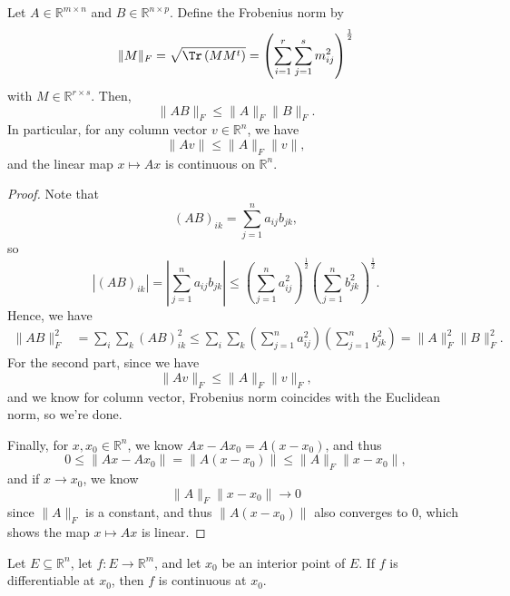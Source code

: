 \begin{theorem}
    Let \(A \in \mathbb{R} ^{m \times n}\) and \(B \in \mathbb{R} ^{n \times p}\). Define the Frobenius norm by 
    \[
        \lVert M \rVert_F = \sqrt{\Tr \left( MM^t \right) } = \left( \sum_{i=1}^r \sum_{j=1}^s m_{ij}^2   \right)^{\frac{1}{2}}   
    \]  
    with \(M \in \mathbb{R} ^{r \times s}\). Then, 
    \[
        \lVert AB \rVert_F \le \lVert A \rVert_F \lVert B \rVert_F.   
    \] 
    In particular, for any column vector \(v \in \mathbb{R} ^n\), we have 
    \[
        \lVert Av \rVert \le \lVert A \rVert_F \lVert v \rVert,   
    \] 
    and the linear map \(x \mapsto Ax\) is continuous on \(\mathbb{R} ^n\). 
\end{theorem}
\begin{proof}
    Note that 
    \[
        (AB)_{ik} = \sum_{j=1}^n a_{ij} b_{jk}, 
    \]
    so 
    \[
        \left\vert (AB)_{ik} \right\vert = \left\vert \sum_{j=1}^n a_{ij} b_{jk}  \right\vert \le \left( \sum_{j=1}^n a_{ij}^2  \right)^{\frac{1}{2}} \left( \sum_{j=1}^n b_{jk}^2  \right)^{\frac{1}{2}}.    
    \]
    Hence, we have 
    \begin{align*}
        \lVert AB \rVert_F^2 &= \sum_{i} \sum_{k} (AB)_{ik}^2 \le \sum_{i} \sum_{k} \left( \sum_{j=1}^n a_{ij}^2  \right) \left( \sum_{j=1}^n b_{jk}^2  \right) = \lVert A \rVert_F^2 \lVert B \rVert_F^2.         
    \end{align*}
    For the second part, since we have 
    \[
        \lVert Av \rVert_F \le \lVert A \rVert_F \lVert v \rVert_F,   
    \]
    and we know for column vector, Frobenius norm coincides with the Euclidean norm, so we're done.

    Finally, for \(x, x_0 \in \mathbb{R} ^n\), we know \(Ax - Ax_0 = A(x - x_0)\), and thus 
    \[
        0 \le \lVert Ax - Ax_0 \rVert = \lVert A(x - x_0) \rVert \le \lVert A \rVert_F \lVert x - x_0 \rVert,    
    \]  
    and if \(x \to x_0\), we know 
    \[
        \lVert A \rVert_F \lVert x - x_0 \rVert \to 0  
    \] 
    since \(\lVert A \rVert_F \) is a constant, and thus \(\lVert A(x - x_0) \rVert \) also converges to \(0\), which shows the map \(x \mapsto Ax\) is linear.    
\end{proof}

\begin{theorem} \label{thm: differentiable implies continuous}
    Let \(E \subseteq \mathbb{R} ^n\), let \(f : E \to \mathbb{R} ^m\), and let \(x_0\) be an interior point of \(E\). If \(f\) is differentiable at \(x_0\), then \(f\) is continuous at \(x_0\).        
\end{theorem}

